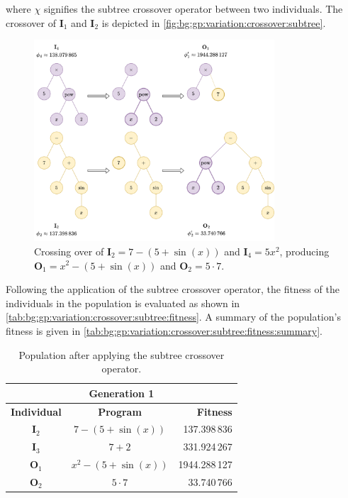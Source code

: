   where \(\chi\) signifies the subtree crossover operator between two 
  individuals.
  The crossover of \(\mathbf{I}_1\) and \(\mathbf{I}_2\) is depicted in
  \vref{fig:bg:gp:variation:crossover:subtree}.

  \begin{figure}[ht!]
    \centering
    \includegraphics[width=0.8\textwidth]
      {img/theoretical_framework/GP Crossover.png}
    \caption{
      Crossing over of \(\mathbf{I}_2 = 7 - (5 + \sin(x))\) and 
      \(\mathbf{I}_4 = 5x^2\), producing \(\mathbf{O}_1 = x^2 - (5 + \sin(x))\) 
      and \(\mathbf{O}_2 = 5 \cdot 7\).
    }
    \label{fig:bg:gp:variation:crossover:subtree}
  \end{figure}


    Following the application of the subtree crossover operator, the fitness of 
    the individuals in the population is evaluated as shown in 
    \vref{tab:bg:gp:variation:crossover:subtree:fitness}.
    A summary of the population's fitness is given in 
    \vref{tab:bg:gp:variation:crossover:subtree:fitness:summary}.

    \begin{table}[ht!]
      \centering
      \begin{tabular}{c|c|r}
        \multicolumn{3}{c}{\textbf{Generation 1}} \\
        \hline
        \hline
        \textbf{Individual} & \textbf{Program}        & \textbf{Fitness} \\
        \hline
        \(\mathbf{I}_2\)    & \(7 - (5 + \sin(x))\)   & 137.398\,836 \\
        \(\mathbf{I}_3\)    & \(7 + 2\)               & 331.924\,267 \\
        \(\mathbf{O}_1\)    & \(x^2 - (5 + \sin(x))\) & 1944.288\,127 \\
        \(\mathbf{O}_2\)    & \(5 \cdot 7\)           & 33.740\,766
      \end{tabular}
      \caption{Population after applying the subtree crossover operator.}
      \label{tab:bg:gp:variation:crossover:subtree:fitness}
    \end{table}

